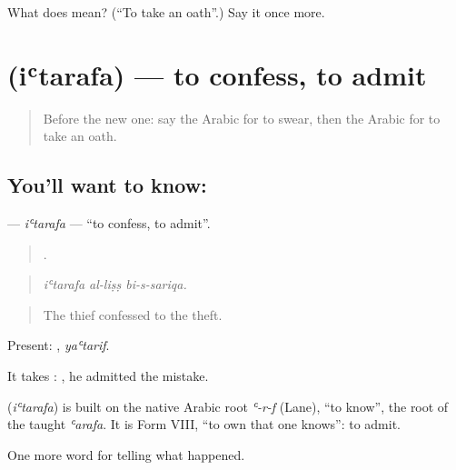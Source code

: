 \begin{tcolorbox}[breakable,colback=teal!4,colframe=teal!35!black,title={Before you move on}]
What does  mean? (\textquotedblleft{}To take an oath\textquotedblright{}.) Say it once more.
\end{tcolorbox}
\section[\texorpdfstring{\ar{اعترف} (iʿtarafa)}{اعترف (iʿtarafa)}]{ (iʿtarafa) — to confess, to admit}

\label{lesson:AR-C325-itarafa}



\begin{quote}
Before the new one: say the Arabic for to swear, then the Arabic for to take an oath.
\end{quote}

\subsection*{You'll want to know: }
\textbf{} — \emph{iʿtarafa} — \textquotedblleft{}to confess, to admit\textquotedblright{}.

\begin{quote}
  .
\end{quote}

\begin{quote}
\emph{iʿtarafa al-liṣṣ bi-s-sariqa.}
\end{quote}

\begin{quote}
The thief confessed to the theft.
\end{quote}

Present: , \emph{yaʿtarif}.

It takes :  , he admitted the mistake.

\begin{cousinweb}
\textbf{} (\emph{iʿtarafa}) is built on the native Arabic root \emph{ʿ-r-f} (Lane), \textquotedblleft{}to know\textquotedblright{}, the root of the taught \emph{ʿarafa}. It is Form VIII, \textquotedblleft{}to own that one knows\textquotedblright{}: to admit.
\end{cousinweb}

\begin{grammarlens}[title={What you've built}]
One more word for telling what happened.
\end{grammarlens}

